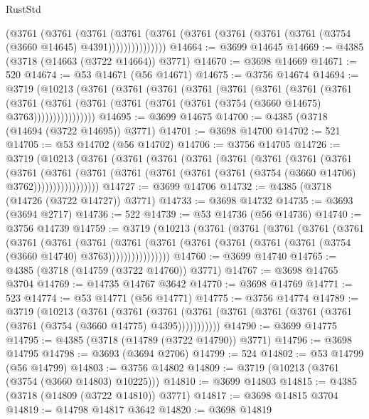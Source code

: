 \begin{lexlean}{RustStd}
\begin{coremodule}
              (@3761
                (@3761
                  (@3761
                    (@3761
                      (@3761 (@3761 (@3761 (@3761 (@3761 (@3754 (@3660 @14645) @4391)))))))))))))))
@14664 := @3699 @14645
@14669 := @4385 (@3718 (@14663 (@3722 @14664)) @3771)
@14670 := @3698 @14669
@14671 := 520
@14674 := @53 @14671 (@56 @14671)
@14675 := @3756 @14674
@14694 := @3719
    (@10213
      (@3761
        (@3761
          (@3761
            (@3761
              (@3761
                (@3761
                  (@3761
                    (@3761
                      (@3761
                        (@3761
                          (@3761 (@3761 (@3761 (@3761 (@3754 (@3660 @14675) @3763))))))))))))))))
@14695 := @3699 @14675
@14700 := @4385 (@3718 (@14694 (@3722 @14695)) @3771)
@14701 := @3698 @14700
@14702 := 521
@14705 := @53 @14702 (@56 @14702)
@14706 := @3756 @14705
@14726 := @3719
    (@10213
      (@3761
        (@3761
          (@3761
            (@3761
              (@3761
                (@3761
                  (@3761
                    (@3761
                      (@3761
                        (@3761
                          (@3761
                            (@3761 (@3761 (@3761 (@3761 (@3754 (@3660 @14706) @3762)))))))))))))))))
@14727 := @3699 @14706
@14732 := @4385 (@3718 (@14726 (@3722 @14727)) @3771)
@14733 := @3698 @14732
@14735 := @3693 (@3694 @2717)
@14736 := 522
@14739 := @53 @14736 (@56 @14736)
@14740 := @3756 @14739
@14759 := @3719
    (@10213
      (@3761
        (@3761
          (@3761
            (@3761
              (@3761
                (@3761
                  (@3761
                    (@3761
                      (@3761
                        (@3761
                          (@3761 (@3761 (@3761 (@3761 (@3754 (@3660 @14740) @3763))))))))))))))))
@14760 := @3699 @14740
@14765 := @4385 (@3718 (@14759 (@3722 @14760)) @3771)
@14767 := @3698 @14765 @3704
@14769 := @14735 @14767 @3642
@14770 := @3698 @14769
@14771 := 523
@14774 := @53 @14771 (@56 @14771)
@14775 := @3756 @14774
@14789 := @3719
    (@10213
      (@3761
        (@3761
          (@3761 (@3761 (@3761 (@3761 (@3761 (@3761 (@3761 (@3754 (@3660 @14775) @4395)))))))))))
@14790 := @3699 @14775
@14795 := @4385 (@3718 (@14789 (@3722 @14790)) @3771)
@14796 := @3698 @14795
@14798 := @3693 (@3694 @2706)
@14799 := 524
@14802 := @53 @14799 (@56 @14799)
@14803 := @3756 @14802
@14809 := @3719 (@10213 (@3761 (@3754 (@3660 @14803) @10225)))
@14810 := @3699 @14803
@14815 := @4385 (@3718 (@14809 (@3722 @14810)) @3771)
@14817 := @3698 @14815 @3704
@14819 := @14798 @14817 @3642
@14820 := @3698 @14819

\end{coremodule}
\end{lexlean}
